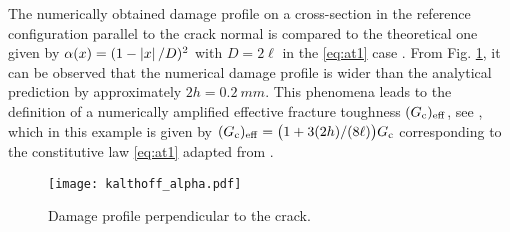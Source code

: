 The numerically obtained damage profile on a cross-section in the reference configuration parallel to the crack normal is compared to the theoretical one given by $\alpha(x)=(1-\left\lvert{x}\right\rvert/D)^2$ with $D=2\ell$ in the \eqref{eq:at1} case \cite{PhamAmorMarigoMaurini:2011}. From Fig. \ref{fig:damageprofile}, it can be observed that the numerical damage profile is wider than the analytical prediction by approximately $2h=\SI{0.2}{mm}$. This phenomena leads to the definition of a numerically amplified effective fracture toughness $(G_\mathrm{c})_\mathrm{eff}$, see \cite{BourdinFrancfortMarigo:2008}, which in this example is given by $(G_\mathrm{c})_\mathrm{eff}=\bigl(1+3(2h)/(8\ell)\bigr)G_\mathrm{c}$ corresponding to the constitutive law \eqref{eq:at1} adapted from \cite{HossainHsuehBourdinBhattachary:2014}.
\begin{figure}[htbp]
\centering
\texttt{[image: kalthoff\_alpha.pdf]}
\caption{Damage profile perpendicular to the crack.} \label{fig:damageprofile}
\end{figure}

